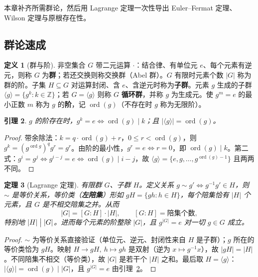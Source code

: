 \documentclass[a4paper,11pt]{ctexart}
\numberwithin{equation}{section}
\theoremstyle{plain}
\newtheorem{theorem}{定理}[section]
\newtheorem{lemma}[theorem]{引理}
\theoremstyle{definition}
\newtheorem{definition}[theorem]{定义}
\theoremstyle{remark}
\newcommand{\Z}{\mathbb{Z}}
\DeclareMathOperator{\ord}{ord}
\begin{document}
本章补齐所需群论，然后用 Lagrange 定理一次性导出 Euler--Fermat 定理、Wilson 定理与原根存在性。

\subsection{群论速成}

\begin{definition}[群与阶]\label{def:group}
非空集合 $G$ 带二元运算 $\cdot$：结合律、有单位元 $e$、每个元素有逆元，则称 $G$ 为\textbf{群}；若还交换则称交换群（Abel 群）。$G$ 有限时元素个数 $|G|$ 称为群的阶。子集 $H\subseteq G$ 对运算封闭、含 $e$、含逆元时称为\textbf{子群}。元素 $g$ 生成的子群 $\langle g\rangle=\{g^k:k\in\Z\}$；若 $G=\langle g\rangle$ 则称 $G$ \textbf{循环群}，并称 $g$ 为生成元。使 $g^m=e$ 的最小正数 $m$ 称为 $g$ 的\textbf{阶}，记 $\ord(g)$（不存在时 $g$ 称为无限阶）。
\end{definition}

\begin{lemma}\label{lem:orderdivide}
$g$ 的阶存在时，$g^k=e\iff \ord(g)\mid k$；且 $|\langle g\rangle|=\ord(g)$。
\end{lemma}

\begin{proof}
带余除法：$k=q\cdot\ord(g)+r$，$0\le r<\ord(g)$，则 $g^k=(g^{\ord g})^qg^r=g^r$。由阶的最小性，$g^r=e\iff r=0$，即 $\ord(g)\mid k$。第二式：$g^i=g^j\iff g^{i-j}=e\iff \ord(g)\mid i-j$，故 $\langle g\rangle=\{e,g,\dots,g^{\ord(g)-1}\}$ 且两两不同。
\end{proof}

\begin{theorem}[Lagrange 定理]\label{thm:Lagrange}
有限群 $G$、子群 $H$。定义关系 $g\sim g'\iff g^{-1}g'\in H$，则 $\sim$ 是等价关系，等价类（\textbf{左陪集}）形如 $gH=\{gh:h\in H\}$，每个陪集恰有 $|H|$ 个元素，且 $G$ 是不相交陪集之并。从而
\[
|G|=[G:H]\cdot|H|, \qquad [G:H]=\text{陪集个数},
\]
特别地 $|H|\bigm||G|$。进而每个元素的阶整除 $|G|$，且 $g^{|G|}=e$ 对一切 $g\in G$ 成立。
\end{theorem}

\begin{proof}
$\sim$ 为等价关系直接验证（单位元、逆元、封闭性来自 $H$ 是子群）；$g$ 所在的等价类恰为 $gH$。映射 $H\to gH,\ h\mapsto gh$ 是双射（逆为 $x\mapsto g^{-1}x$），故 $|gH|=|H|$。不同陪集不相交（等价类），故 $|G|$ 是若干个 $|H|$ 之和。最后取 $H=\langle g\rangle$：$|\langle g\rangle|=\ord(g)\mid|G|$，且 $g^{|G|}=e$ 由引理~\ref{lem:orderdivide}。
\end{proof}
\end{document}
